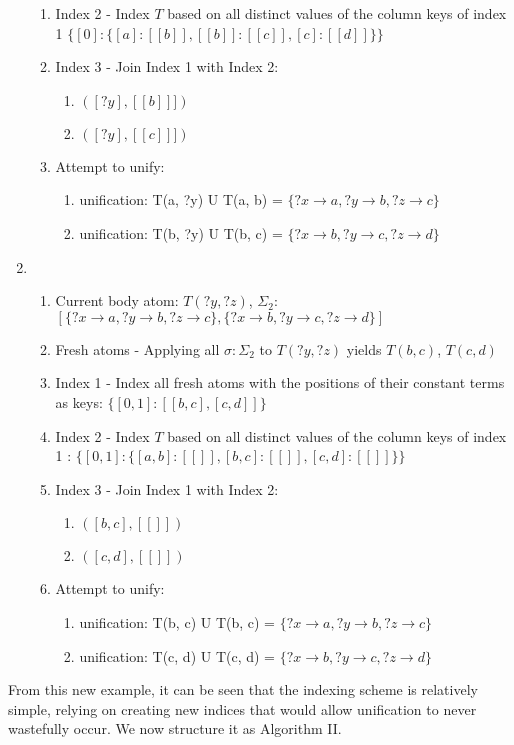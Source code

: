 \documentclass[sigconf,screen,review=false,natbib]{acmart}
\theoremstyle{definition}
\begin{document}
\begin{enumerate}
\begin{enumerate}
		      \item Index 2 - Index $T$ based on all distinct values of the column keys of index 1  $\{[0]: \{[a]: [[b]], [[b]]: [[c]], [c]: [[d]]\}\}$
		      \item Index 3 - Join Index 1 with Index 2:
		            \begin{enumerate}
			            \item $([?y], [[b]]])$
			            \item $([?y], [[c]]])$
		            \end{enumerate}
		      \item Attempt to unify:
		            \begin{enumerate}
			            \item unification: T(a, ?y) U T(a, b) = $\{?x \rightarrow a, ?y \rightarrow b, ?z \rightarrow c\}$
			            \item unification: T(b, ?y) U T(b, c) = $\{?x \rightarrow b, ?y \rightarrow c, ?z \rightarrow d\}$
		            \end{enumerate}
	      \end{enumerate}
	\item \begin{enumerate}
		      \item Current body atom: $T(?y, ?z)$, $\Sigma_2$: $[\{?x \rightarrow a, ?y \rightarrow b, ?z \rightarrow c\}, \{?x \rightarrow b, ?y \rightarrow c, ?z \rightarrow d\}]$
		      \item Fresh atoms - Applying all $\sigma : \Sigma_2$ to $T(?y, ?z)$ yields $T(b, c)$, $T(c, d)$
		      \item Index 1 - Index all fresh atoms with the positions of their constant terms as keys: $\{[0, 1] : [[b, c], [c, d]]\}$
		      \item Index 2 - Index $T$ based on all distinct values of the column keys of index 1 : $\{[0, 1]: \{[a, b]: [[]], [b, c]: [[]], [c, d]: [[]]\}\}$
		      \item Index 3 - Join Index 1 with Index 2:
		            \begin{enumerate}
			            \item $([b, c], [[]])$
			            \item $([c, d], [[]])$
		            \end{enumerate}
		      \item Attempt to unify:
		            \begin{enumerate}
			            \item unification: T(b, c) U T(b, c) = $\{?x \rightarrow a, ?y \rightarrow b, ?z \rightarrow c\}$
			            \item unification: T(c, d) U T(c, d) = $\{?x \rightarrow b, ?y \rightarrow c, ?z \rightarrow d\}$
		            \end{enumerate}
	      \end{enumerate}
\end{enumerate}
From this new example, it can be seen that the indexing scheme is relatively simple, relying on creating new indices that would allow unification
to never wastefully occur. We now structure it as Algorithm II.
\end{document}
